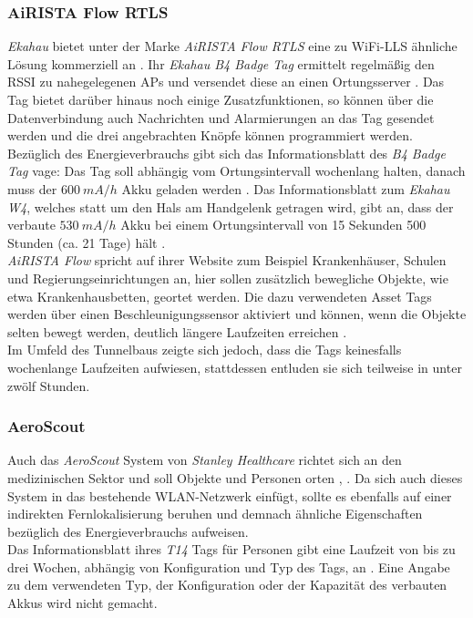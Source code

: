 \subsubsection{AiRISTA Flow RTLS}
\emph{Ekahau} bietet unter der Marke \textit{AiRISTA Flow RTLS} eine zu WiFi-LLS ähnliche Lösung kommerziell an \cite{airista2017airista}.
Ihr \emph{Ekahau B4 Badge Tag} ermittelt regelmäßig den RSSI zu nahegelegenen APs und versendet diese an einen Ortungsserver \cite{liu2007survey}.
Das Tag bietet darüber hinaus noch einige Zusatzfunktionen, so können über die Datenverbindung auch Nachrichten und Alarmierungen an das Tag gesendet werden und die drei angebrachten Knöpfe können programmiert werden.\\
Bezüglich des Energieverbrauchs gibt sich das Informationsblatt des \emph{B4 Badge Tag} vage: Das Tag soll abhängig vom Ortungsintervall wochenlang halten, danach muss der $600\ mA/h$ Akku geladen werden \cite{ekahau2017b4}.
Das Informationsblatt zum \emph{Ekahau W4}, welches statt um den Hals am Handgelenk getragen wird, gibt an, dass der verbaute $530\ mA/h$ Akku bei einem Ortungsintervall von 15 Sekunden 500 Stunden (ca. 21 Tage) hält \cite{ekahau2017w4}.\\
\emph{AiRISTA Flow} spricht auf ihrer Website zum Beispiel Krankenhäuser, Schulen und Regierungseinrichtungen an, hier sollen zusätzlich bewegliche Objekte, wie etwa Krankenhausbetten, geortet werden.
Die dazu verwendeten Asset Tags werden über einen Beschleunigungssensor aktiviert und können, wenn die Objekte selten bewegt werden, deutlich längere Laufzeiten erreichen \cite{ekahau2017a4}. \\
Im Umfeld des Tunnelbaus zeigte sich jedoch, dass die Tags keinesfalls wochenlange Laufzeiten aufwiesen, stattdessen entluden sie sich teilweise in unter zwölf Stunden.

\subsubsection{AeroScout}
Auch das \emph{AeroScout} System von \emph{Stanley Healthcare} richtet sich an den medizinischen Sektor und soll Objekte und Personen orten \cite{aeroscout2017asset}, \cite{aeroscout2017staff}.
Da sich auch dieses System in das bestehende WLAN-Netzwerk einfügt, sollte es ebenfalls auf einer indirekten Fernlokalisierung beruhen und demnach ähnliche Eigenschaften bezüglich des Energieverbrauchs aufweisen.\\
Das Informationsblatt ihres \emph{T14} Tags für Personen gibt eine Laufzeit von bis zu drei Wochen, abhängig von Konfiguration und Typ des Tags, an \cite{aeroscout2017t14}. 
Eine Angabe zu dem verwendeten Typ, der Konfiguration oder der Kapazität des verbauten Akkus wird nicht gemacht.\\

